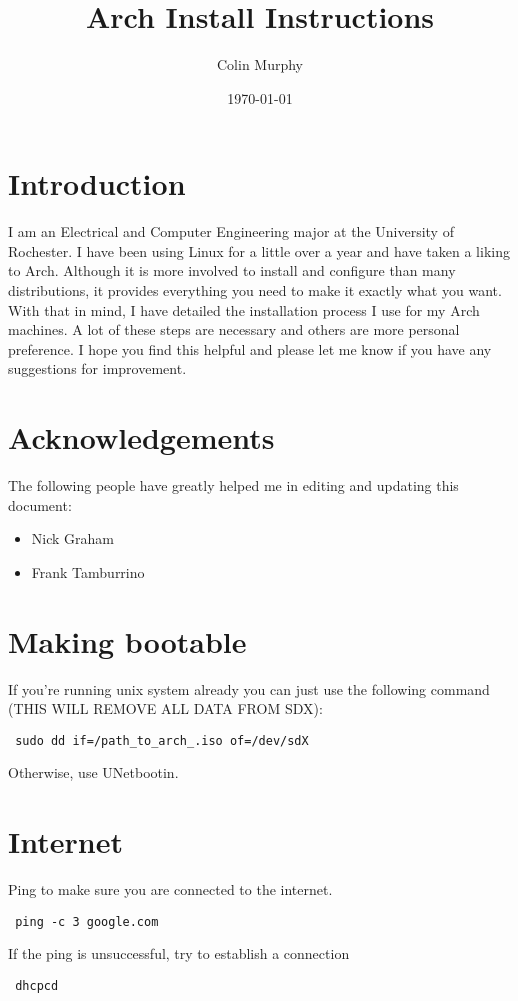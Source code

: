\documentclass[12pt]{article}
\title{\textbf{Arch Install Instructions}}
\date{\today}
\author{Colin Murphy}
\begin{document}
\clearpage\maketitle
\maketitle

\section*{Introduction}
    I am an Electrical and Computer Engineering major at the University of
    Rochester. I have been using Linux for a little over a year and have taken
    a liking to Arch. Although it is more involved to install and configure
    than many distributions, it provides everything you need to make it exactly
    what you want. With that in mind, I have detailed the installation process
    I use for my Arch machines. A lot of these steps are necessary and others
    are more personal preference. I hope you find this helpful and please let
    me know if you have any suggestions for improvement.

\section*{Acknowledgements}
The following people have greatly helped me in editing and updating this
document:
\begin{itemize}
    \item Nick Graham
    \item Frank Tamburrino
\end{itemize}
\section*{Making bootable}
    If you're running unix system already you can just use the following command
    (THIS WILL REMOVE ALL DATA FROM SDX):
    \begin{verbatim} sudo dd if=/path_to_arch_.iso of=/dev/sdX \end{verbatim}
    Otherwise, use UNetbootin.

\section*{Internet}
    Ping to make sure you are connected to the internet.
    \begin{verbatim} ping -c 3 google.com \end{verbatim}
    If the ping is unsuccessful, try to establish a connection
    \begin{verbatim} dhcpcd \end{verbatim}
\end{document}
